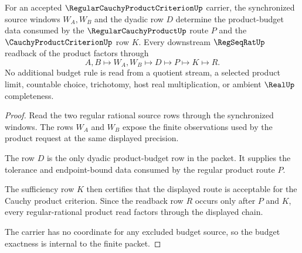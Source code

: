 \begin{theorem}
\label{thm:regular-cauchy-product-criterion-window-budget-exactness}
For an accepted $\RegularCauchyProductCriterionUp$ carrier, the synchronized source windows $W_A,W_B$ and the dyadic row $D$ determine the product-budget data consumed by the $\RegularCauchyProductUp$ route $P$ and the $\CauchyProductCriterionUp$ row $K$. Every downstream $\RegSeqRatUp$ readback of the product factors through
$$
A,B\longmapsto W_A,W_B\longmapsto D\longmapsto P\longmapsto K\longmapsto R .
$$
No additional budget rule is read from a quotient stream, a selected product limit, countable choice, trichotomy, host real multiplication, or ambient $\RealUp$ completeness.
\end{theorem}
\begin{proof}
Read the two regular rational source rows through the synchronized windows. The rows $W_A$ and $W_B$ expose the finite observations used by the product request at the same displayed precision.

The row $D$ is the only dyadic product-budget row in the packet. It supplies the tolerance and endpoint-bound data consumed by the regular product route $P$.

The sufficiency row $K$ then certifies that the displayed route is acceptable for the Cauchy product criterion. Since the readback row $R$ occurs only after $P$ and $K$, every regular-rational product read factors through the displayed chain.

The carrier has no coordinate for any excluded budget source, so the budget exactness is internal to the finite packet.
\end{proof}

